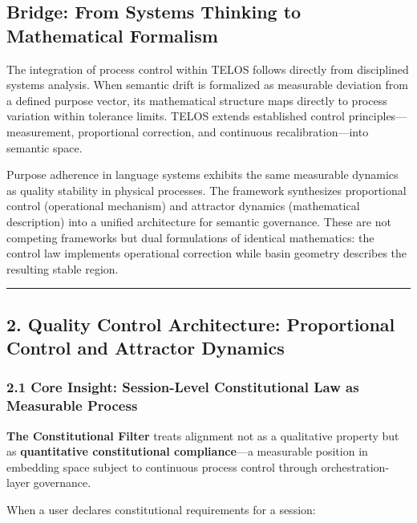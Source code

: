 \subsection{Bridge: From Systems Thinking to Mathematical
Formalism}\label{bridge-from-systems-thinking-to-mathematical-formalism}

The integration of process control within TELOS follows directly from
disciplined systems analysis. When semantic drift is formalized as
measurable deviation from a defined purpose vector, its mathematical
structure maps directly to process variation within tolerance limits.
TELOS extends established control principles---measurement, proportional
correction, and continuous recalibration---into semantic space.

Purpose adherence in language systems exhibits the same measurable
dynamics as quality stability in physical processes. The framework
synthesizes proportional control (operational mechanism) and attractor
dynamics (mathematical description) into a unified architecture for
semantic governance. These are not competing frameworks but dual
formulations of identical mathematics: the control law implements
operational correction while basin geometry describes the resulting
stable region.

\begin{center}\rule{0.5\linewidth}{0.5pt}\end{center}

\subsection{2. Quality Control Architecture: Proportional Control and
Attractor
Dynamics}\label{quality-control-architecture-proportional-control-and-attractor-dynamics}

\subsubsection{2.1 Core Insight: Session-Level Constitutional Law as
Measurable
Process}\label{core-insight-session-level-constitutional-law-as-measurable-process}

\textbf{The Constitutional Filter} treats alignment not as a qualitative
property but as \textbf{quantitative constitutional compliance}---a
measurable position in embedding space subject to continuous process
control through orchestration-layer governance.

When a user declares constitutional requirements for a session:

